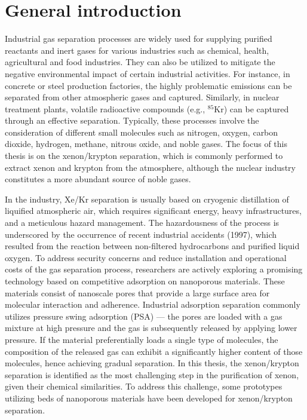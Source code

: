 
\chapter*{General introduction}

Industrial gas separation processes are widely used for supplying purified reactants and inert gases for various industries such as chemical, health, agricultural and food industries. They can also be utilized to mitigate the negative environmental impact of certain industrial activities. For instance, in concrete or steel production factories, the highly problematic  emissions can be separated from other atmospheric gases and captured. Similarly, in nuclear treatment plants, volatile radioactive compounds (e.g., $^{85}$Kr) can be captured through an effective separation. Typically, these processes involve the consideration of different small molecules such as nitrogen, oxygen, carbon dioxide, hydrogen, methane, nitrous oxide, and noble gases. The focus of this thesis is on the xenon/krypton separation, which is commonly performed to extract xenon and krypton from the atmosphere,\autocite{kerry2007industrial} although the nuclear industry constitutes a more abundant source of noble gases.\autocite{Banerjee_2014}

In the industry, Xe/Kr separation is usually based on cryogenic distillation of liquified atmospheric air, which requires significant energy, heavy infrastructures, and a meticulous hazard management. The hazardousness of the process is underscored by the occurrence of recent industrial accidents (1997), which resulted from the reaction between non-filtered hydrocarbons and purified liquid oxygen.\autocite{distill_accident,distill_accident2} To address security concerns and reduce installation and operational costs of the gas separation process, researchers are actively exploring a promising technology based on competitive adsorption on nanoporous materials. These materials consist of nanoscale pores that provide a large surface area for molecular interaction and adherence. Industrial adsorption separation commonly utilizes pressure swing adsorption (PSA) --- the pores are loaded with a gas mixture at high pressure and the gas is subsequently released by applying lower pressure. If the material preferentially loads a single type of molecules, the composition of the released gas can exhibit a significantly higher content of those molecules, hence achieving gradual separation. In this thesis, the xenon/krypton separation is identified as the most challenging step in the purification of xenon, given their chemical similarities. To address this challenge, some prototypes utilizing beds of nanoporous materials have been developed for xenon/krypton separation.\autocite{Banerjee2018}

